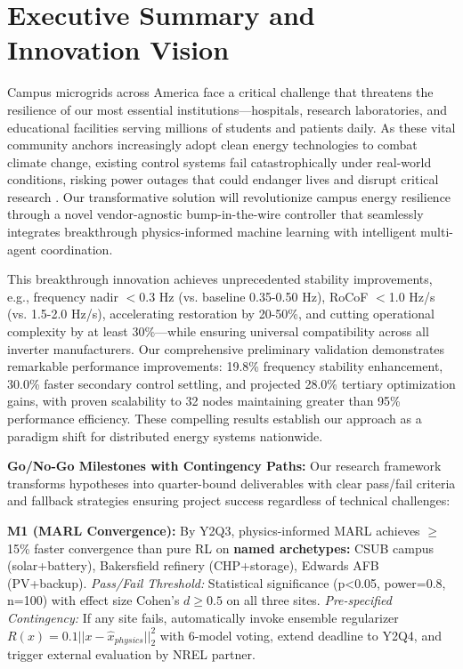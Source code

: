 \documentclass[12pt]{article}
\begin{document}
\section{Executive Summary and Innovation Vision}

Campus microgrids across America face a critical challenge that threatens the resilience of our most essential institutions---hospitals, research laboratories, and educational facilities serving millions of students and patients daily. As these vital community anchors increasingly adopt clean energy technologies to combat climate change, existing control systems fail catastrophically under real-world conditions, risking power outages that could endanger lives and disrupt critical research \cite{molina2020,katiraei2008}. Our transformative solution will revolutionize campus energy resilience through a novel vendor-agnostic bump-in-the-wire controller that seamlessly integrates breakthrough physics-informed machine learning with intelligent multi-agent coordination.

This breakthrough innovation achieves unprecedented stability improvements, e.g., frequency nadir $<$0.3 Hz (vs. baseline 0.35-0.50 Hz), RoCoF $<$1.0 Hz/s (vs. 1.5-2.0 Hz/s), accelerating restoration by 20-50\%, and cutting operational complexity by at least 30\%---while ensuring universal compatibility across all inverter manufacturers. Our comprehensive preliminary validation demonstrates remarkable performance improvements: 19.8\% frequency stability enhancement, 30.0\% faster secondary control settling, and projected 28.0\% tertiary optimization gains, with proven scalability to 32 nodes maintaining greater than 95\% performance efficiency. These compelling results establish our approach as a paradigm shift for distributed energy systems nationwide.

\textbf{Go/No-Go Milestones with Contingency Paths:} Our research framework transforms hypotheses into quarter-bound deliverables with clear pass/fail criteria and fallback strategies ensuring project success regardless of technical challenges:

\textbf{M1 (MARL Convergence):} By Y2Q3, physics-informed MARL achieves $\geq$15\% faster convergence than pure RL on \textbf{named archetypes:} CSUB campus (solar+battery), Bakersfield refinery (CHP+storage), Edwards AFB (PV+backup). \textit{Pass/Fail Threshold:} Statistical significance (p<0.05, power=0.8, n=100) with effect size Cohen's $d \geq 0.5$ on all three sites. \textit{Pre-specified Contingency:} If any site fails, automatically invoke ensemble regularizer $R(x) = 0.1||x - \hat{x}_{physics}||_2^2$ with 6-model voting, extend deadline to Y2Q4, and trigger external evaluation by NREL partner.
\end{document}
